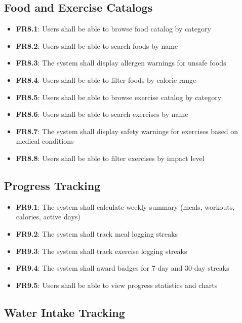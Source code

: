 \subsection{Food and Exercise Catalogs}

\begin{itemize}
    \item \textbf{FR8.1}: Users shall be able to browse food catalog by category
    \item \textbf{FR8.2}: Users shall be able to search foods by name
    \item \textbf{FR8.3}: The system shall display allergen warnings for unsafe foods
    \item \textbf{FR8.4}: Users shall be able to filter foods by calorie range
    \item \textbf{FR8.5}: Users shall be able to browse exercise catalog by category
    \item \textbf{FR8.6}: Users shall be able to search exercises by name
    \item \textbf{FR8.7}: The system shall display safety warnings for exercises based on medical conditions
    \item \textbf{FR8.8}: Users shall be able to filter exercises by impact level
\end{itemize}

\subsection{Progress Tracking}

\begin{itemize}
    \item \textbf{FR9.1}: The system shall calculate weekly summary (meals, workouts, calories, active days)
    \item \textbf{FR9.2}: The system shall track meal logging streaks
    \item \textbf{FR9.3}: The system shall track exercise logging streaks
    \item \textbf{FR9.4}: The system shall award badges for 7-day and 30-day streaks
    \item \textbf{FR9.5}: Users shall be able to view progress statistics and charts
\end{itemize}

\subsection{Water Intake Tracking}

